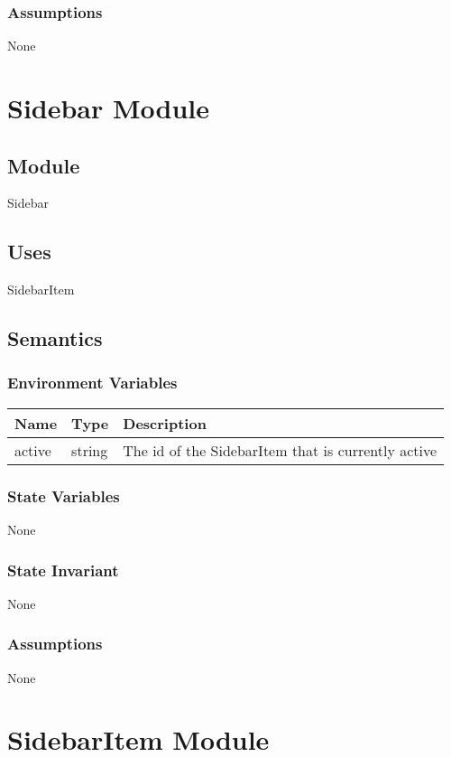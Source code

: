 \documentclass[12pt]{article}
\begin{document}
\subsubsection{Assumptions}
None

\newpage


\section{Sidebar Module}

\subsection{Module}
Sidebar

\subsection{Uses}
SidebarItem

\subsection{Semantics}

\subsubsection{Environment Variables}
\begin{tabular}{| l | l | p{10cm} |}
    \hline
    \textbf{Name} & \textbf{Type} & \textbf{Description}\\ \hline
    active & string & The id of the SidebarItem that is currently active\\ \hline
\end{tabular}

\subsubsection{State Variables}
None

\subsubsection{State Invariant}
None

\subsubsection{Assumptions}
None

\newpage


\section{SidebarItem Module}
\end{document}

